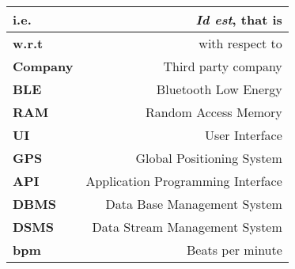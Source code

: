 \renewcommand{\arraystretch}{1.5}
\begin{center}
    \begin{tabular}{|l|r|}
        \hline
        \textbf{i.e.} & \textit{Id est}, that is  \\
        \hline
        \textbf{w.r.t} & with respect to  \\
        \hline
        \textbf{Company} & Third party company \\
        \hline
        \textbf{BLE} & Bluetooth Low Energy \\
        \hline
        \textbf{RAM} & Random Access Memory \\
        \hline
        \textbf{UI} & User Interface \\
        \hline
        \textbf{GPS} & Global Positioning System \\
        \hline
        \textbf{API} & Application Programming Interface \\
        \hline
        \textbf{DBMS} & Data Base Management System \\
        \hline
        \textbf{DSMS} & Data Stream Management System \\
        \hline        
        \textbf{bpm} & Beats per minute \\
        \hline
    \end{tabular}
\end{center}